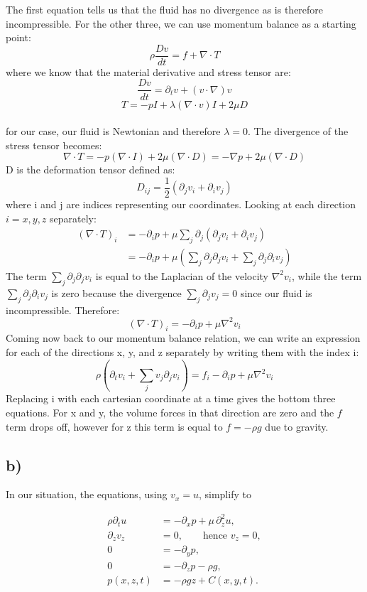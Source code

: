 \documentclass{article}
\begin{document}
The first equation tells us that the fluid has no divergence as is therefore incompressible.
For the other three, we can use momentum balance as a starting point:
$$\rho\frac{Dv}{dt} = f + \nabla \cdot T$$
where we know that the material derivative and stress tensor are:
$$\frac{Dv}{dt} = \partial_t v + (v \cdot \nabla)v$$
$$T = -pI + \lambda(\nabla \cdot v)I + 2\mu D$$ \\
for our case, our fluid is Newtonian and therefore $\lambda = 0$. The divergence of the stress tensor becomes:
$$\nabla \cdot T = -p(\nabla \cdot I) + 2\mu(\nabla \cdot D) = -\nabla p + 2\mu(\nabla \cdot D)$$
D is the deformation tensor defined as:
$$D_{ij} = \frac{1}{2}\left(\partial_j v_i + \partial_i v_j\right)$$
where i and j are indices representing our coordinates. Looking at each direction $i = x, y, z$ separately:
\begin{align*}
    (\nabla \cdot T)_i &= - \partial_i p + \mu \sum_j \partial_j (\partial_j v_i + \partial_i v_j) \\
    &= -\partial_i p + \mu \left(\sum_j \partial_j \partial_j v_i + \sum_j \partial_j \partial_i v_j\right)
\end{align*}
The term $\sum_j \partial_j \partial_j v_i$ is equal to the Laplacian of the velocity $\nabla^2 v_i$, while the term $\sum_j \partial_j \partial_i v_j$ is zero because the divergence $\sum_j \partial_j v_j = 0$ since our fluid is incompressible.
Therefore:
$$(\nabla \cdot T)_i = -\partial_i p +\mu \nabla^2 v_i$$
Coming now back to our momentum balance relation, we can write an expression for each of the directions x, y, and z separately by writing them with the index i:
$$\rho \left(\partial_t v_i + \sum_j v_j \partial_j v_i \right) = f_i - \partial_i p + \mu \nabla^2 v_i$$
Replacing i with each cartesian coordinate at a time gives the bottom three equations. For x and y, the volume forces in that direction are zero and the $f$ term drops off, however for z this term is equal to $f = - \rho g$ due to gravity.

\subsection*{b)}

In our situation, the equations, using $v_x = u$, simplify to

\begin{align}
    \rho \partial_t u &= -\partial_x p + \mu \,\partial_z^2 u, \label{eq:b1}\\
    \partial_z v_z &= 0, \qquad \text{hence } v_z = 0, \label{eq:b2}\\
    0 &= -\partial_y p, \label{eq:b3}\\
    0 &= -\partial_z p - \rho g, \label{eq:b4} \\
    p(x,z,t) &= -\rho g z + C(x,y,t). \label{eq:b5}
\end{align}
\end{document}
